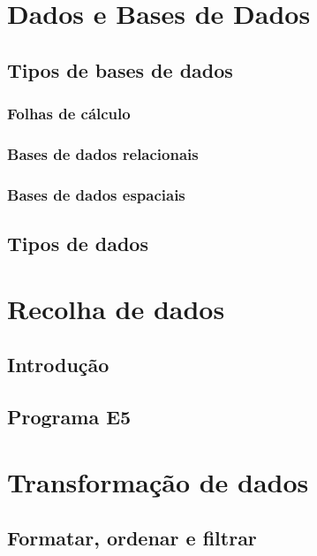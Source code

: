 \documentclass[
  letterpaper,
  DIV=11,
  numbers=noendperiod]{scrreprt}
\begin{document}

\part{Dados e Bases de Dados}

\chapter{Tipos de bases de dados}\label{tipos-de-bases-de-dados}

\section{Folhas de cálculo}\label{folhas-de-cuxe1lculo}

\section{Bases de dados relacionais}\label{bases-de-dados-relacionais}

\section{Bases de dados espaciais}\label{bases-de-dados-espaciais}

\chapter{Tipos de dados}\label{tipos-de-dados}

\part{Recolha de dados}

\chapter{Introdução}\label{introduuxe7uxe3o-1}

\chapter{Programa E5}\label{programa-e5}

\part{Transformação de dados}

\chapter{Formatar, ordenar e filtrar}\label{formatar-ordenar-e-filtrar}
\end{document}
